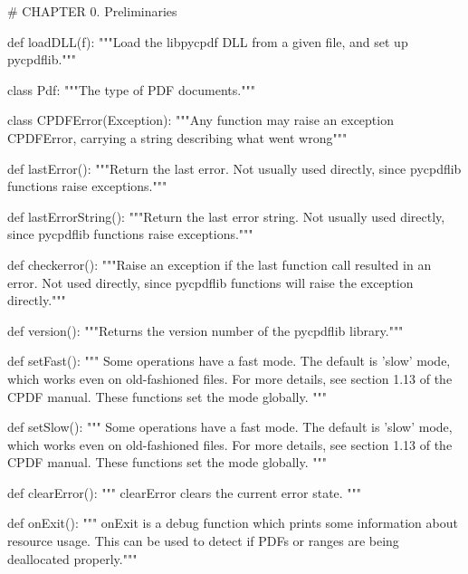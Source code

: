 # CHAPTER 0. Preliminaries

def loadDLL(f):
    """Load the libpycpdf DLL from a given file, and set up pycpdflib."""

class Pdf:
    """The type of PDF documents."""

class CPDFError(Exception):
    """Any function may raise an exception CPDFError, carrying a string
    describing what went wrong"""

def lastError():
    """Return the last error. Not usually used directly, since pycpdflib
    functions raise exceptions."""

def lastErrorString():
    """Return the last error string. Not usually used directly, since pycpdflib
    functions raise exceptions."""

def checkerror():
    """Raise an exception if the last function call resulted in an error. Not
    used directly, since pycpdflib functions will raise the exception
    directly."""

def version():
    """Returns the version number of the pycpdflib library."""

def setFast():
    """ Some operations have a fast mode. The default is 'slow' mode, which
    works even on old-fashioned files. For more details, see section 1.13 of
    the CPDF manual. These functions set the mode globally. """

def setSlow():
    """ Some operations have a fast mode. The default is 'slow' mode, which
    works even on old-fashioned files. For more details, see section 1.13 of
    the CPDF manual. These functions set the mode globally. """

def clearError():
    """ clearError clears the current error state. """

def onExit():
    """ onExit is a debug function which prints some information about
    resource usage. This can be used to detect if PDFs or ranges are being
    deallocated properly."""
